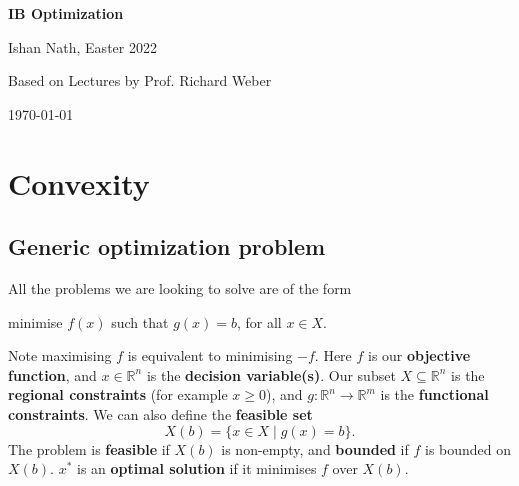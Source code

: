 \documentclass[12pt]{article}
\theoremstyle{definition}
\theoremstyle{remark}
\begin{document}
\hypersetup{pageanchor=false}
\begin{titlepage}
	\begin{center}
		\vspace*{1em}
		\Huge
		\textbf{IB Optimization}

		\vspace{1em}
		\large
		Ishan Nath, Easter 2022

		\vspace{1.5em}

		\Large

		Based on Lectures by Prof. Richard Weber

		\vspace{1em}

		\large
		\today
	\end{center}
	
\end{titlepage}
\hypersetup{pageanchor=true}

\tableofcontents

\newpage

\section{Convexity}%
\label{sec:convexity}

\subsection{Generic optimization problem}%
\label{sub:generic_optimization_problem}

All the problems we are looking to solve are of the form
\begin{center}
	minimise $f(x)$ such that $g(x) = b$, for all $x \in X$.
\end{center}
Note maximising $f$ is equivalent to minimising $-f$. Here $f$ is our \textbf{objective function}, and $x \in \mathbb{R}^{n}$ is the \textbf{decision variable(s)}. Our subset $X \subseteq \mathbb{R}^{n}$ is the \textbf{regional constraints} (for example $x \geq 0$), and $g : \mathbb{R}^{n} \to \mathbb{R}^{m}$ is the \textbf{functional constraints}. We can also define the \textbf{feasible set}
\[
	X(b) = \{x \in X \mid g(x) = b\}
.\]
The problem is \textbf{feasible} if $X(b)$ is non-empty, and \textbf{bounded} if $f$ is bounded on $X(b)$. $x^{\ast}$ is an \textbf{optimal solution} if it minimises $f$ over $X(b)$.
\end{document}

